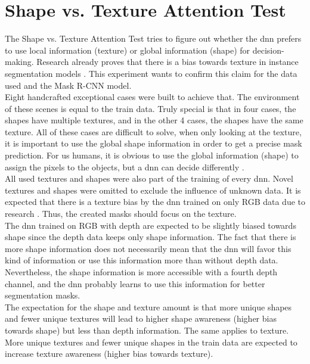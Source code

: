 	\section{Shape vs. Texture Attention Test}
	\label{sec:shape-texutre-attention-test}
		The Shape vs. Texture Attention Test tries to figure out whether the \ac{dnn} prefers to use local information (texture) or global information (shape) for decision-making. Research already proves that there is a bias towards texture in instance segmentation models \cite{Theodoridis2022}. This experiment wants to confirm this claim for the data used and the Mask R-CNN model.\\
		Eight handcrafted exceptional cases were built to achieve that. The environment of these scenes is equal to the train data. Truly special is that in four cases, the shapes have multiple textures, and in the other 4 cases, the shapes have the same texture. All of these cases are difficult to solve, when only looking at the texture, it is important to use the global shape information in order to get a precise mask prediction. For us humans, it is obvious to use the global information (shape) to assign the pixels to the objects, but a \ac{dnn} can decide differently \cite{Geirhos2020}\cite{Mohla2022}\cite{Baker2020}.\\
		All used textures and shapes were also part of the training of every \ac{dnn}. Novel textures and shapes were omitted to exclude the influence of unknown data.
		\clearpage
		It is expected that there is a texture bias by the \ac{dnn} trained on only RGB data due to research \cite{Theodoridis2022}. Thus, the created masks should focus on the texture. \\
		The \ac{dnn} trained on RGB with depth are expected to be slightly biased towards shape since the depth data keeps only shape information. The fact that there is more shape information does not necessarily mean that the \ac{dnn} will favor this kind of information or use this information more than without depth data. Nevertheless, the shape information is more accessible with a fourth depth channel, and the \ac{dnn} probably learns to use this information for better segmentation masks.\\
		The expectation for the shape and texture amount is that more unique shapes and fewer unique textures will lead to higher shape awareness (higher bias towards shape) but less than depth information. The same applies to texture. More unique textures and fewer unique shapes in the train data are expected to increase texture awareness (higher bias towards texture). \\
